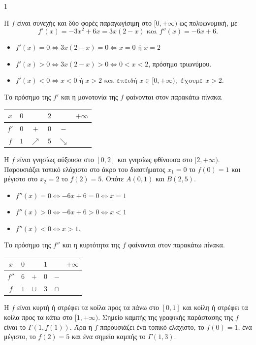 \begin{ylh}{1}
    \item [Ύλη από εικόνα]
\end{ylh}
\begin{rlist}
\item [i.] Η $f$ είναι συνεχής και δύο φορές παραγωγίσιμη στο $[0, +\infty)$ ως πολυωνυμική, με
\[ f'(x) = -3x^2 + 6x = 3x(2-x) \text{ και } f''(x) = -6x+6. \]
\begin{itemize}
    \item $f'(x) = 0 \Leftrightarrow 3x(2-x) = 0 \Leftrightarrow x=0 \text{ ή } x=2$
    \item $f'(x) > 0 \Leftrightarrow 3x(2-x) > 0 \Leftrightarrow 0 < x < 2$, πρόσημο τριωνύμου.
    \item $f'(x) < 0 \Leftrightarrow x < 0 \text{ ή } x > 2 \text{ και επειδή } x \in [0, +\infty), \text{ έχουμε } x > 2$.
\end{itemize}
Το πρόσημο της $f'$ και η μονοτονία της $f$ φαίνονται στον παρακάτω πίνακα.
\begin{center}
\begin{tabular}{|c||c|c|c|c|c|}
\hline
$x$ & $0$ & & $2$ & & $+\infty$ \\
\hline \hline
$f'$ & $0$ & $+$ & $0$ & $-$ & \\
\hline
$f$ & $1$ & $\nearrow$ & $5$ & $\searrow$ & \\
\hline
\end{tabular}
\end{center}
\monades{}

\item [ii.] Η $f$ είναι γνησίως αύξουσα στο $[0,2]$ και γνησίως φθίνουσα στο $[2, +\infty)$. Παρουσιάζει τοπικό ελάχιστο στο άκρο του διαστήματος $x_1 = 0$ το $f(0)=1$ και μέγιστο στο $x_2=2$ το $f(2)=5$. Οπότε $A(0,1)$ και $B(2,5)$.
\begin{itemize}
    \item $f''(x)=0 \Leftrightarrow -6x+6=0 \Leftrightarrow x=1$
    \item $f''(x)>0 \Leftrightarrow -6x+6>0 \Leftrightarrow x<1$
    \item $f''(x)<0 \Leftrightarrow x>1$.
\end{itemize}
Το πρόσημο της $f''$ και η κυρτότητα της $f$ φαίνονται στον παρακάτω πίνακα.
\begin{center}
\begin{tabular}{|c||c|c|c|c|c|}
\hline
$x$ & $0$ & & $1$ & & $+\infty$ \\
\hline \hline
$f''$ & $6$ & $+$ & $0$ & $-$ & \\
\hline
$f$ & $1$ & $\cup$ & $3$ & $\cap$ & \\
\hline
\end{tabular}
\end{center}
Η $f$ είναι κυρτή ή στρέφει τα κοίλα προς τα πάνω στο $[0,1]$ και κοίλη ή στρέφει τα κοίλα προς τα κάτω στο $[1, +\infty)$. Σημείο καμπής της γραφικής παράστασης της $f$ είναι το $\Gamma(1, f(1))$.
Άρα η $f$ παρουσιάζει ένα τοπικό ελάχιστο, το $f(0)=1$, ένα μέγιστο, το $f(2)=5$ και ένα σημείο καμπής το $\Gamma(1,3)$.
\monades{}
\end{rlist}

